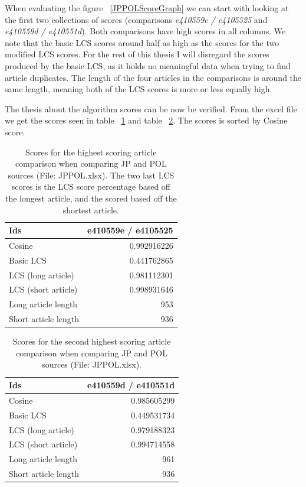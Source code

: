 When evaluating the figure ~\ref{JPPOLScoreGraph} we can start with looking at the first two collections of scores (comparisons \textit{e410559e / e4105525} and \textit{e410559d / e410551d}). Both comparisons have high scores in all columns. We note that the basic LCS scores around half as high as the scores for the two modified LCS scores. For the rest of this thesis I will disregard the scores produced by the basic LCS, as it holds no meaningful data when trying to find article duplicates. The length of the four articles in the comparisons is around the same length, meaning both of the LCS scores is more or less equally high.

The thesis about the algorithm scores can be now be verified. From the excel file we get the scores seen in table ~\ref{JPPOLHighScores} and table ~\ref{JPPOLSecondHighestScores}. The scores is sorted by Cosine score. 

\begin{table}
\begin{center}
	\begin{tabular}{l | r}
	Ids & e410559e / e4105525\\ \hline
	Cosine & 0.992916226\\ \hline
	Basic LCS & 0.441762865\\ \hline
	LCS (long article) & 0.981112301\\ \hline
	LCS (short article) & 0.998931646\\ \hline
	Long article length & 953\\ \hline
	Short article length & 936\\ \hline	
	\end{tabular}
\end{center}
\caption{Scores for the highest scoring article comparison when comparing JP and POL sources (File: JPPOL.xlsx). The two last LCS scores is the LCS score percentage based off the longest article, and the scored based off the shortest article.}
\label{JPPOLHighScores}
\end{table}

\begin{table}
\begin{center}
	\begin{tabular}{l | r}
	Ids & e410559d / e410551d\\ \hline
	Cosine & 0.985605299\\ \hline
	Basic LCS & 0.449531734\\ \hline
	LCS (long article) & 0.979188323\\ \hline
	LCS (short article) & 0.994714558\\ \hline
	Long article length & 961\\ \hline
	Short article length & 936\\ \hline	
	\end{tabular}
\end{center}
\caption{Scores for the second highest scoring article comparison when comparing JP and POL sources (File: JPPOL.xlsx).}
\label{JPPOLSecondHighestScores}
\end{table}

